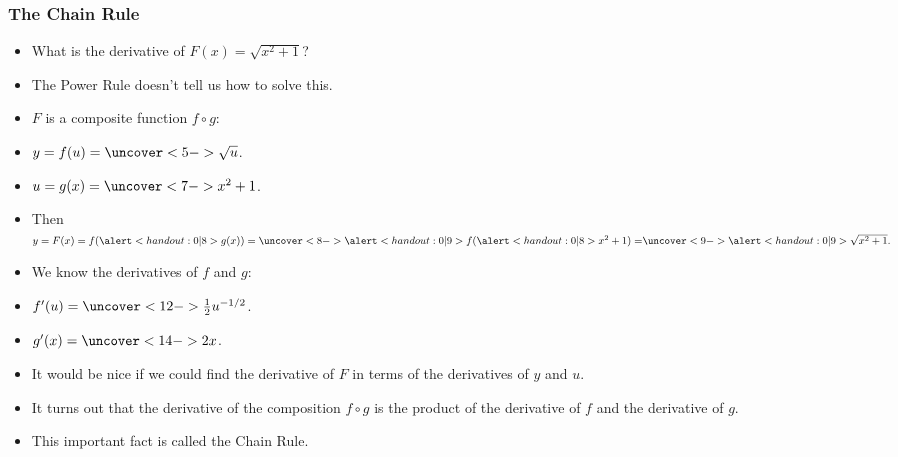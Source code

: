 \begin{frame}
\frametitle{The Chain Rule}
\begin{itemize}
\item  What is the derivative of $F(x) = \sqrt{x^2 + 1}$?
\item<2->  The Power Rule doesn't tell us how to solve this.
\item<3->  $F$ is a composite function $f\circ g$:
\item<3-| alert@4-5,9,11-12>  $y = f(u) = \uncover<5->{\sqrt{u}}$.
\item<3-| alert@6-8,13-14>  $u = g(x) = \uncover<7->{x^2+1}$.
\item<3->  Then $y = F(x) = f(\alert<handout:0| 8>{g(x)}) = \uncover<8->{\alert<handout:0| 9>{f(\alert<handout:0| 8>{x^2+1}) =}}  \uncover<9->{\alert<handout:0| 9>{\sqrt{x^2+1}}.}$
\item<10->  We know the derivatives of $f$ and $g$:
\item<10-| alert@11-12>  $f'(u) = \uncover<12->{\frac{1}{2}u^{-1/2}}$.
\item<10-| alert@13-14>  $g'(x) = \uncover<14->{2x}$.
\item<15->  It would be nice if we could find the derivative of $F$ in terms of the derivatives of $y$ and $u$.
\item<16->  It turns out that the derivative of the composition $f\circ g$ is the product of the derivative of $f$ and the derivative of $g$.
\item<17->  This important fact is called the Chain Rule.
\end{itemize}
\end{frame}
